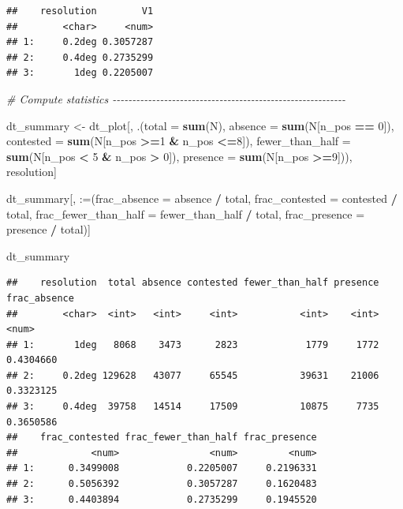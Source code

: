 \documentclass[
  11pt,
]{article}
\newenvironment{Shaded}{\begin{snugshade}}{\end{snugshade}}
\newcommand{\AttributeTok}[1]{\textcolor[rgb]{0.13,0.29,0.53}{#1}}
\newcommand{\CommentTok}[1]{\textcolor[rgb]{0.56,0.35,0.01}{\textit{#1}}}
\newcommand{\DecValTok}[1]{\textcolor[rgb]{0.00,0.00,0.81}{#1}}
\newcommand{\FunctionTok}[1]{\textcolor[rgb]{0.13,0.29,0.53}{\textbf{#1}}}
\newcommand{\NormalTok}[1]{#1}
\newcommand{\OtherTok}[1]{\textcolor[rgb]{0.56,0.35,0.01}{#1}}
\newcommand{\SpecialCharTok}[1]{\textcolor[rgb]{0.81,0.36,0.00}{\textbf{#1}}}
\newcommand{\StringTok}[1]{\textcolor[rgb]{0.31,0.60,0.02}{#1}}
\begin{document}
\begin{verbatim}
##    resolution        V1
##        <char>     <num>
## 1:     0.2deg 0.3057287
## 2:     0.4deg 0.2735299
## 3:       1deg 0.2205007
\end{verbatim}

\begin{Shaded}
\begin{Highlighting}[]
\CommentTok{\# Compute statistics {-}{-}{-}{-}{-}{-}{-}{-}{-}{-}{-}{-}{-}{-}{-}{-}{-}{-}{-}{-}{-}{-}{-}{-}{-}{-}{-}{-}{-}{-}{-}{-}{-}{-}{-}{-}{-}{-}{-}{-}{-}{-}{-}{-}{-}{-}{-}{-}{-}{-}{-}{-}{-}{-}{-}{-}{-}{-}{-}}

\NormalTok{dt\_summary }\OtherTok{\textless{}{-}}\NormalTok{ dt\_plot[, .(}\AttributeTok{total =} \FunctionTok{sum}\NormalTok{(N),}
                          \AttributeTok{absence =} \FunctionTok{sum}\NormalTok{(N[n\_pos }\SpecialCharTok{==} \DecValTok{0}\NormalTok{]),}
                          \AttributeTok{contested =} \FunctionTok{sum}\NormalTok{(N[n\_pos }\SpecialCharTok{\textgreater{}=}\DecValTok{1} \SpecialCharTok{\&}\NormalTok{ n\_pos }\SpecialCharTok{\textless{}=}\DecValTok{8}\NormalTok{]),}
                          \AttributeTok{fewer\_than\_half =} \FunctionTok{sum}\NormalTok{(N[n\_pos }\SpecialCharTok{\textless{}} \DecValTok{5} \SpecialCharTok{\&}\NormalTok{ n\_pos }\SpecialCharTok{\textgreater{}} \DecValTok{0}\NormalTok{]),}
                          \AttributeTok{presence =} \FunctionTok{sum}\NormalTok{(N[n\_pos }\SpecialCharTok{\textgreater{}=}\DecValTok{9}\NormalTok{])),}
\NormalTok{                      resolution]}

\NormalTok{dt\_summary[, }\StringTok{\textasciigrave{}}\AttributeTok{:=}\StringTok{\textasciigrave{}}\NormalTok{(}\AttributeTok{frac\_absence =}\NormalTok{ absence }\SpecialCharTok{/}\NormalTok{ total,}
                  \AttributeTok{frac\_contested =}\NormalTok{ contested }\SpecialCharTok{/}\NormalTok{ total,}
                  \AttributeTok{frac\_fewer\_than\_half =}\NormalTok{ fewer\_than\_half }\SpecialCharTok{/}\NormalTok{ total,}
                  \AttributeTok{frac\_presence =}\NormalTok{ presence }\SpecialCharTok{/}\NormalTok{ total)]}

\NormalTok{dt\_summary}
\end{Highlighting}
\end{Shaded}

\begin{verbatim}
##    resolution  total absence contested fewer_than_half presence frac_absence
##        <char>  <int>   <int>     <int>           <int>    <int>        <num>
## 1:       1deg   8068    3473      2823            1779     1772    0.4304660
## 2:     0.2deg 129628   43077     65545           39631    21006    0.3323125
## 3:     0.4deg  39758   14514     17509           10875     7735    0.3650586
##    frac_contested frac_fewer_than_half frac_presence
##             <num>                <num>         <num>
## 1:      0.3499008            0.2205007     0.2196331
## 2:      0.5056392            0.3057287     0.1620483
## 3:      0.4403894            0.2735299     0.1945520
\end{verbatim}
\end{document}
